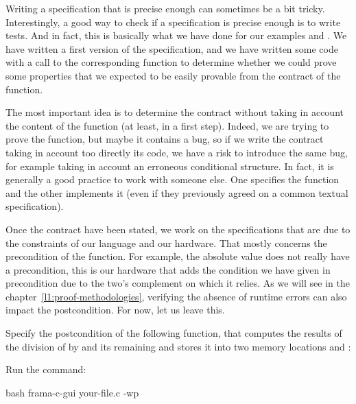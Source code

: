 

Writing a specification that is precise enough can sometimes be a bit tricky.
Interestingly, a good way to check if a specification is precise enough is to
write tests. And in fact, this is basically what we have done for our examples
 and . We have written a first version of the
specification, and we have written some code with a call to the corresponding
function to determine whether we could prove some properties that we expected to
be easily provable from the contract of the function.



The most important
idea is to determine the contract without taking in account the content of the
function (at least, in a first step). Indeed, we are trying to prove the
function, but maybe it contains a bug, so if we write the contract taking in
account too directly its code, we have a risk to introduce the same bug, for
example taking in account an erroneous conditional structure. In fact, it is
generally a good practice to work with someone else. One specifies the function
and the other implements it (even if they previously agreed on a common textual
specification).



Once the contract have been stated, we work on the specifications that are due
to the constraints of our language and our hardware. That mostly concerns the
precondition of the function. For example, the absolute value does not really
have a precondition, this is our hardware that adds the condition we have given
in precondition due to the two's complement on which it relies. As we will see
in the chapter~\ref{l1:proof-methodologies}, verifying the absence of runtime
errors can also impact the postcondition. For now, let us leave this.








Specify the postcondition of the following function, that computes the
results of the division of  by  and its
remaining and stores it into two memory locations  and
:



Run the command:

\begin{CodeBlock}{bash}
frama-c-gui your-file.c -wp
\end{CodeBlock}


